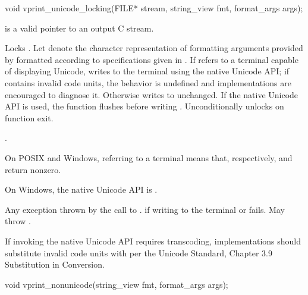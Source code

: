 %
\begin{itemdecl}
void vprint_unicode_locking(FILE* stream, string_view fmt, format_args args);
\end{itemdecl}

\begin{itemdescr}
\pnum
\expects
{} is a valid pointer to an output C stream.

\pnum
\effects
Locks .
Let  denote the character representation of
formatting arguments provided by 
formatted according to specifications given in .
If  refers to a terminal capable of displaying Unicode,
writes  to the terminal using the native Unicode API;
if  contains invalid code units,
%
the behavior is undefined and
implementations are encouraged to diagnose it.
Otherwise writes  to  unchanged.
If the native Unicode API is used,
the function flushes  before writing .
Unconditionally unlocks  on function exit.

.

\begin{note}
On POSIX and Windows,  referring to a terminal means that,
respectively,
 and
return nonzero.
\end{note}
\begin{note}
On Windows, the native Unicode API is .
\end{note}

\pnum
\throws
Any exception thrown by the call to .
 if writing to the terminal or  fails.
May throw .

\pnum
\recommended
If invoking the native Unicode API requires transcoding,
implementations should substitute invalid code units
with  per
the Unicode Standard, Chapter 3.9  Substitution in Conversion.
\end{itemdescr}

%
\begin{itemdecl}
void vprint_nonunicode(string_view fmt, format_args args);
\end{itemdecl}

